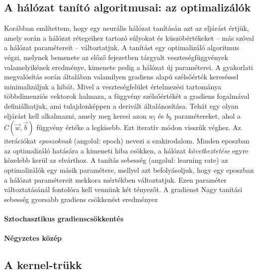 \subsection{A hálózat tanító algoritmusai: az optimalizálók}
Korábban említettem, hogy egy neurális hálózat tanításán azt az eljárást értjük, amely során a hálózat rétegeihez tartozó súlyokat és küszöbértékeket -- más szóval a hálózat paramétereit -- változtatjuk. A tanítást egy optimalizáló algoritmus végzi, melynek bemenete az előző fejezetben tárgyalt veszteségfüggvények valamelyikének eredménye, kimenete pedig a hálózat új paraméterei. A gyakorlati megvalósítás során általában valamilyen gradiens alapú szélsőérték kereséssel minimalizáljuk a hibát. Mivel a veszteségfelület értelmezési tartománya többdimenziós vektorok halmaza, a függvény szélsőértékét a gradiens fogalmával definiálhatjuk, ami tulajdonképpen a derivált általánosítása. Tehát egy olyan eljárást kell alkalmazni, amely meg keresi azon $w_l$ és $b_k$ paramétereket, ahol a $C(\vec{w},\vec{b})$ függvény értéke a legkisebb.
Ezt iteratív módon visszük véghez. Az iterációkat \emph{eposzoknak} (angolul: epoch) nevezi a szakirodalom. Minden eposzban az optimalizáló hatására a kimeneti hiba csökken, a hálózat \emph{következtetése} egyre közelebb kerül az elvárthoz. A tanítás sebesség (angolul: learning rate) az optimalizálók egy másik paramétere, mellyel azt befolyásoljuk, hogy egy eposzban a hálózat paramétereit mekkora mértékben változtatjuk. Ezen paraméter változtatásánál fontolóra kell vennünk két tényezőt.
A gradienst
Nagy tanítási sebesség gyorsabb gradiens csökkenést eredményez

\paragraph[SGD]{Sztochasztikus gradienscsökkentés}

\paragraph[RMSprop]{Négyzetes közép}

\subsection{A kernel-trükk}

